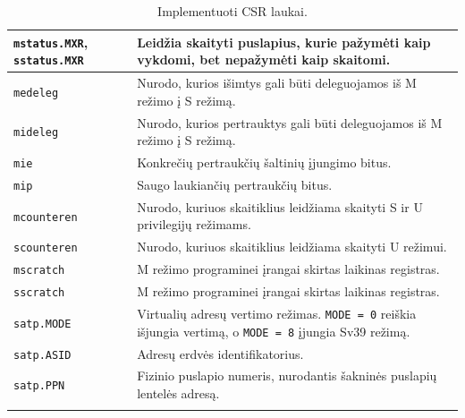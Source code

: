 \begin{longtable}{|p{}|p{}|}
    \hline
    \texttt{mstatus.MXR}, \texttt{sstatus.MXR} & Leidžia skaityti puslapius, kurie pažymėti kaip vykdomi, bet nepažymėti kaip skaitomi. \\
    \hline
    \texttt{medeleg} & Nurodo, kurios išimtys gali būti deleguojamos iš M režimo į S režimą. \\
    \hline
    \texttt{mideleg} & Nurodo, kurios pertrauktys gali būti deleguojamos iš M režimo į S režimą. \\
    \hline
    \texttt{mie} & Konkrečių pertraukčių šaltinių įjungimo bitus. \\
    \hline
    \texttt{mip} & Saugo laukiančių pertraukčių bitus. \\
    \hline
    \texttt{mcounteren} & Nurodo, kuriuos skaitiklius leidžiama skaityti S ir U privilegijų režimams. \\
    \hline
    \texttt{scounteren} & Nurodo, kuriuos skaitiklius leidžiama skaityti U režimui. \\
    \hline
    \texttt{mscratch} & M režimo programinei įrangai skirtas laikinas registras. \\
    \hline
    \texttt{sscratch} & M režimo programinei įrangai skirtas laikinas registras. \\
    \hline

    \texttt{satp.MODE} & Virtualių adresų vertimo režimas. \texttt{MODE = 0} reiškia išjungia vertimą, o \texttt{MODE = 8} įjungia Sv39 režimą. \\
    \hline
    \texttt{satp.ASID}  & Adresų erdvės identifikatorius. \\
    \hline
    \texttt{satp.PPN} & Fizinio puslapio numeris, nurodantis šakninės puslapių lentelės adresą. \\
    \hline

    \caption{Implementuoti CSR laukai.}
    \label{table:csr-laukai}
\end{longtable}
